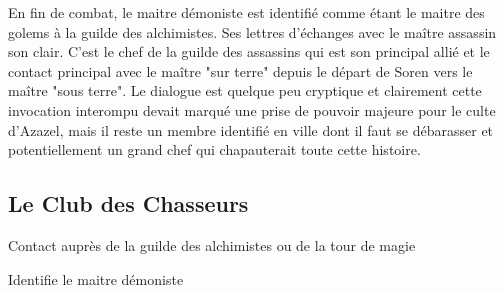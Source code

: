 En fin de combat, le maitre démoniste est identifié comme étant le maitre des 
golems à la guilde des alchimistes. Ses lettres d'échanges avec le maître assassin
son clair. C'est le chef de la guilde des assassins qui est son principal allié 
et le contact principal avec le maître "sur terre" depuis le départ de Soren vers le 
maître "sous terre". Le dialogue est quelque peu cryptique et clairement cette invocation
interompu devait marqué une prise de pouvoir majeure pour le culte d'Azazel, mais
il reste un membre identifié en ville dont il faut se débarasser et potentiellement
un grand chef qui chapauterait toute cette histoire.

\subsection*{Le Club des Chasseurs}

Contact auprès de la guilde des alchimistes ou de la tour de magie


Identifie le maitre démoniste


